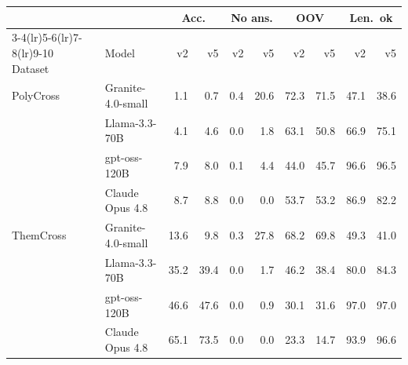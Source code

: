 \begin{tabular}{llrrrrrrrr}
\toprule
 & & \multicolumn{2}{c}{Acc.} & \multicolumn{2}{c}{No ans.} & \multicolumn{2}{c}{OOV} & \multicolumn{2}{c}{Len.\ ok} \\
\cmidrule(lr){3-4}\cmidrule(lr){5-6}\cmidrule(lr){7-8}\cmidrule(lr){9-10}
Dataset & Model & v2 & v5 & v2 & v5 & v2 & v5 & v2 & v5 \\
\midrule
PolyCross & Granite-4.0-small & 1.1 & 0.7 & 0.4 & 20.6 & 72.3 & 71.5 & 47.1 & 38.6 \\
 & Llama-3.3-70B & 4.1 & 4.6 & 0.0 & 1.8 & 63.1 & 50.8 & 66.9 & 75.1 \\
 & gpt-oss-120B & 7.9 & 8.0 & 0.1 & 4.4 & 44.0 & 45.7 & 96.6 & 96.5 \\
 & Claude Opus 4.8 & 8.7 & 8.8 & 0.0 & 0.0 & 53.7 & 53.2 & 86.9 & 82.2 \\
\midrule
ThemCross & Granite-4.0-small & 13.6 & 9.8 & 0.3 & 27.8 & 68.2 & 69.8 & 49.3 & 41.0 \\
 & Llama-3.3-70B & 35.2 & 39.4 & 0.0 & 1.7 & 46.2 & 38.4 & 80.0 & 84.3 \\
 & gpt-oss-120B & 46.6 & 47.6 & 0.0 & 0.9 & 30.1 & 31.6 & 97.0 & 97.0 \\
 & Claude Opus 4.8 & 65.1 & 73.5 & 0.0 & 0.0 & 23.3 & 14.7 & 93.9 & 96.6 \\
\bottomrule
\end{tabular}
